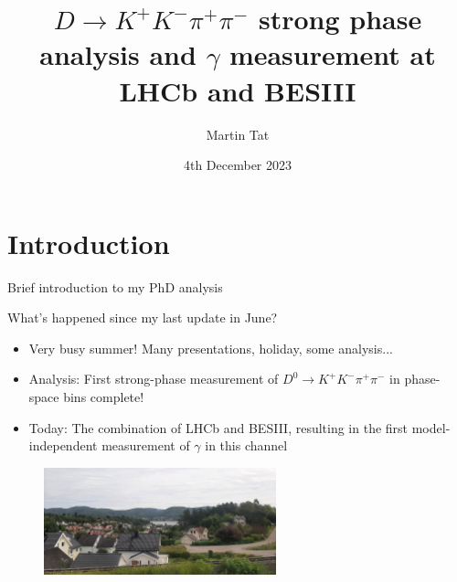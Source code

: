 \documentclass{beamer}
\title[$K^+K^-\pi^+\pi^-$]{\texorpdfstring{$D\to K^+K^-\pi^+\pi^-$}{K+K-pi+pi-} strong phase analysis and $\gamma$ measurement at LHCb and BESIII}
\author{Martin Tat}
\institute{Oxford LHCb}
\date{4th December 2023}
\begin{document}
\begin{frame}
  \titlepage
\end{frame}


\section{Introduction}

\begin{frame}{Brief introduction to my PhD analysis}
  \begin{center}
    \Large{What's happened since my last update in June?}
  \end{center}
  \vspace{0.1cm}
  \begin{itemize}
    \setlength\itemsep{0.7em}
    \item{Very busy summer! Many presentations, holiday, some analysis...}
    \item{Analysis: First strong-phase measurement of $D^0\to K^+K^-\pi^+\pi^-$ in phase-space bins complete!}
    \item{Today: The combination of LHCb and BESIII, resulting in the first model-independent measurement of $\gamma$ in this channel}
  \end{itemize}
  \begin{figure}
    \centering
    \includegraphics[width = 0.6\textwidth]{Plots/20230803_120917.jpg}
  \end{figure}
\end{frame}
\end{document}
